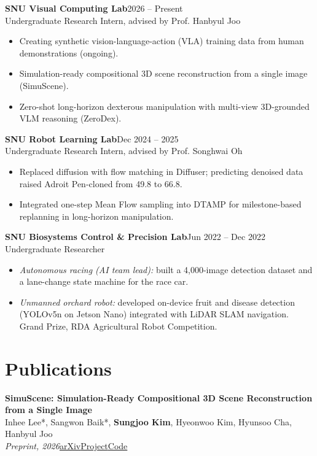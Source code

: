 \documentclass[10pt,a4paper]{article}
\newcommand{\entry}[3]{%
  {\textbf{#1}\hfill{\color{muted}\small #2}}\\
  {\color{muted}#3}\par}
\newcommand{\pub}[4]{%
  \textbf{#1}\\
  {\small #2}\\
  {\small\color{muted}\textit{#3}\quad #4}\par}
\newcommand{\me}{\textbf{Sungjoo Kim}}
\newcommand{\sep}{\enspace{\color{rule}|}\enspace}
\begin{document}
\entry{SNU Visual Computing Lab}{2026 -- Present}
      {Undergraduate Research Intern, advised by Prof. Hanbyul Joo}
\begin{itemize}
  \item Creating synthetic vision-language-action (VLA) training data from human demonstrations (ongoing).
  \item Simulation-ready compositional 3D scene reconstruction from a single image (SimuScene).
  \item Zero-shot long-horizon dexterous manipulation with multi-view 3D-grounded VLM reasoning (ZeroDex).
\end{itemize}
\vspace{3pt}
\entry{SNU Robot Learning Lab}{Dec 2024 -- 2025}
      {Undergraduate Research Intern, advised by Prof. Songhwai Oh}
\begin{itemize}
  \item Replaced diffusion with flow matching in Diffuser; predicting denoised data raised Adroit Pen-cloned from 49.8 to 66.8.
  \item Integrated one-step Mean Flow sampling into DTAMP for milestone-based replanning in long-horizon manipulation.
\end{itemize}
\vspace{3pt}
\entry{SNU Biosystems Control \& Precision Lab}{Jun 2022 -- Dec 2022}
      {Undergraduate Researcher}
\begin{itemize}
  \item \textit{Autonomous racing (AI team lead):} built a 4,000-image detection dataset and a lane-change state machine for the race car.
  \item \textit{Unmanned orchard robot:} developed on-device fruit and disease detection (YOLOv5n on Jetson Nano) integrated with LiDAR SLAM navigation. Grand Prize, RDA Agricultural Robot Competition.
\end{itemize}

\section{Publications}

\pub{SimuScene: Simulation-Ready Compositional 3D Scene Reconstruction from a Single Image}
    {Inhee Lee*, Sangwon Baik*, \me, Hyeonwoo Kim, Hyunsoo Cha, Hanbyul Joo}
    {Preprint, 2026}
    {\href{https://arxiv.org/abs/2606.03994}{arXiv}\sep\href{https://snuvclab.github.io/SimuScene/}{Project}\sep\href{https://github.com/snuvclab/SimuScene}{Code}}
\vspace{5pt}
\end{document}
